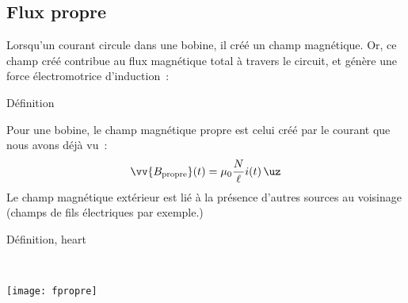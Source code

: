 \documentclass[../main/main.tex]{subfiles}
\begin{document}
\subsection{Flux propre}
\label{ssec:fpropre}
Lorsqu'un courant circule dans une bobine, il créé un champ magnétique. Or, ce
champ créé contribue au flux magnétique total à travers le circuit, et génère
une force électromotrice d'induction~:
\begin{tdefi}{Définition}
\end{tdefi}
Pour une bobine, le champ magnétique propre est celui créé par le courant que
nous avons déjà vu~:
\[
	\vv{B_{\rm propre}}(t) = \mu_0 \frac{N}{\ell }i(t)\,\uz
\]
Le champ magnétique extérieur est lié à la présence d'autres sources au
voisinage (champs de fils électriques par exemple.)

\begin{tdefi}{Définition, heart}
	\noindent
	\begin{minipage}[t]{.7\linewidth}
		\begin{center}
		\end{center}
	\end{minipage}
	\hfill
	\begin{minipage}[t]{.29\linewidth}
		~
		\vspace*{-20pt}
		\begin{center}
			\texttt{[image: fpropre]}
			\label{fig:fpropre}
		\end{center}
	\end{minipage}
\end{tdefi}
\end{document}
